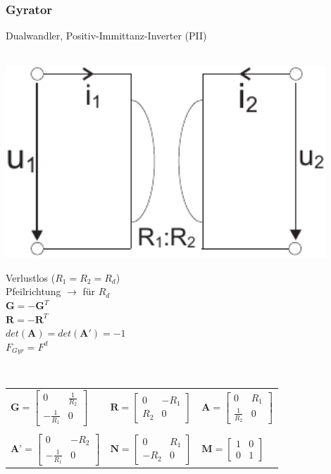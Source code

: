 \documentclass[a4paper,twocolumn,10pt]{article}
\begin{document}
\subsubsection*{Gyrator}
Dualwandler, Positiv-Immittanz-Inverter (PII)\\\\
\begin{minipage}[b]{0.2\textwidth}
\includegraphics[width=0.9\textwidth]{img/OP_Gyrator}
\end{minipage}
\hfill
\begin{minipage}[b]{0.26\textwidth}
Verlustlos ($R_1=R_2=R_d$)\\
Pfeilrichtung $\rightarrow$ für $R_d$\\
$\textbf{G}=-\textbf{G}^T$\\
$\textbf{R}=-\textbf{R}^T$\\
$det(\textbf{A})=det(\textbf{A}')=-1$\\
$F_{Gyr}=F^d$
\end{minipage}\\

\begin{tabular}{lll}
$\textbf{G}=\begin{bmatrix}0 & \frac{1}{R_2}\\ -\frac{1}{R_1} & 0\end{bmatrix}$ & $\textbf{R}=\begin{bmatrix}0 & -R_1\\ R_2 & 0\end{bmatrix}$ & $\textbf{A}=\begin{bmatrix}0 & R_1\\ \frac{1}{R_2} & 0\end{bmatrix}$\\\\
$\textbf{A'}=\begin{bmatrix}0 & -R_2\\ -\frac{1}{R_1} & 0\end{bmatrix}$ & $\textbf{N}=\begin{bmatrix}0 & R_1\\ -R_2 & 0\end{bmatrix}$ & $\textbf{M}=\begin{bmatrix}1 & 0\\ 0 & 1\end{bmatrix}$
\end{tabular}
\end{document}
